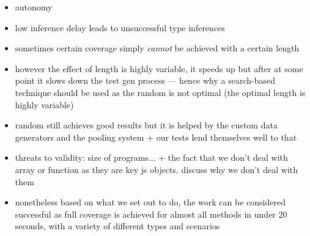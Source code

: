 \begin{itemize}
   \item autonomy
   \item low inference delay leads to unsuccessful type inferences
   \item sometimes certain coverage simply \emph{cannot} be achieved with a certain length
   \item however the effect of length is highly variable, it speeds up but after at some point it slows down the test gen process --- hence why a search-based technique should be used as the random is not optimal (the optimal length is highly variable)
   \item random still achieves good results but it is helped by the custom data generators and the pooling system + our tests lend themselves well to that
   \item threats to validity: size of programs... + the fact that we don't deal with array or function as they are key js objects. discuss why we don't deal with them
   \item nonetheless based on what we set out to do, the work can be considered successful as full coverage is achieved for almost all methods in under 20 seconds, with a variety of different types and scenarios
\end{itemize}
